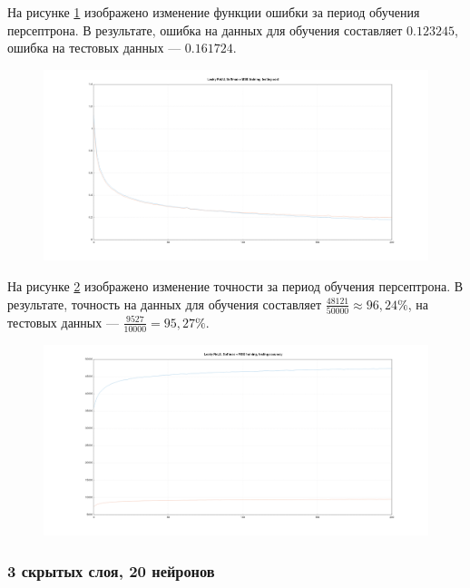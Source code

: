 \documentclass[a4paper, 14pt]{extarticle}
\begin{document}
На рисунке \ref{fig:1_40_leaky_relu_softmax_mse_cost} изображено изменение функции ошибки за период обучения персептрона.
В результате, ошибка на данных для обучения составляет $0.123245$, ошибка на тестовых данных --- $0.161724$.

\begin{figure}[!htb]
  \centering\includegraphics[width=\textwidth]{images/1_40_leaky_relu_softmax_mse_cost.png}
  \caption{}
  \label{fig:1_40_leaky_relu_softmax_mse_cost}
\end{figure}

На рисунке \ref{fig:1_40_leaky_relu_softmax_mse_accuracy} изображено изменение точности за период обучения персептрона.
В результате, точность на данных для обучения составляет $\frac{48121}{50000} \approx 96,24\%$, на тестовых данных --- $\frac{9527}{10000} = 95,27\%$.

\begin{figure}[!htb]
  \centering\includegraphics[width=\textwidth]{images/1_40_leaky_relu_softmax_mse_accuracy.png}
  \caption{}
  \label{fig:1_40_leaky_relu_softmax_mse_accuracy}
\end{figure}

\subsubsection{3 скрытых слоя, 20 нейронов}
\end{document}
